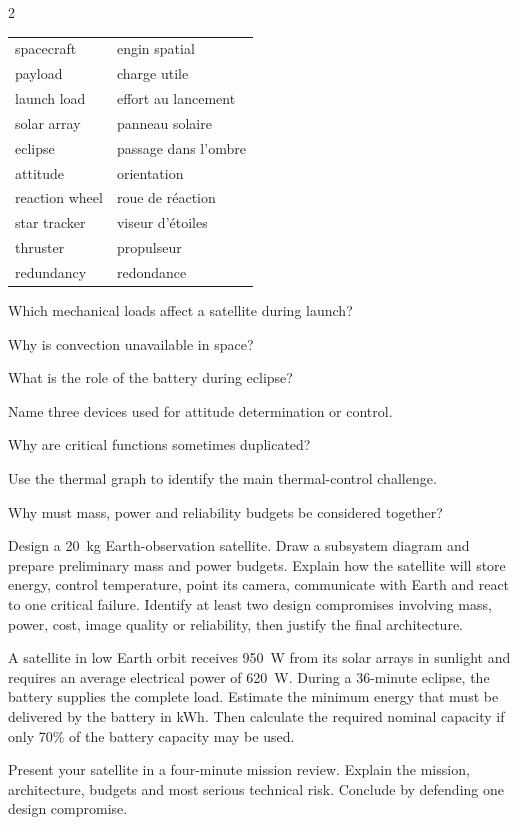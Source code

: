 \begin{multicols}{2}
\begin{vocabulary}
\begin{tabularx}{\linewidth}{@{}lX@{}}
spacecraft & engin spatial\\
payload & charge utile\\
launch load & effort au lancement\\
solar array & panneau solaire\\
eclipse & passage dans l'ombre\\
attitude & orientation\\
reaction wheel & roue de réaction\\
star tracker & viseur d'étoiles\\
thruster & propulseur\\
redundancy & redondance
\end{tabularx}
\end{vocabulary}

\begin{questions}
\item Which mechanical loads affect a satellite during launch?
\item Why is convection unavailable in space?
\item What is the role of the battery during eclipse?
\item Name three devices used for attitude determination or control.
\item Why are critical functions sometimes duplicated?
\item Use the thermal graph to identify the main thermal-control challenge.
\item Why must mass, power and reliability budgets be considered together?
\end{questions}

\begin{engineeringchallenge}
Design a 20~kg Earth-observation satellite. Draw a subsystem diagram and prepare preliminary mass and power budgets. Explain how the satellite will store energy, control temperature, point its camera, communicate with Earth and react to one critical failure. Identify at least two design compromises involving mass, power, cost, image quality or reliability, then justify the final architecture.
\end{engineeringchallenge}

\begin{applicationexercise}
A satellite in low Earth orbit receives 950~W from its solar arrays in sunlight and requires an average electrical power of 620~W. During a 36-minute eclipse, the battery supplies the complete load. Estimate the minimum energy that must be delivered by the battery in kWh. Then calculate the required nominal capacity if only 70\% of the battery capacity may be used.
\end{applicationexercise}

\begin{speaking}
Present your satellite in a four-minute mission review. Explain the mission, architecture, budgets and most serious technical risk. Conclude by defending one design compromise.
\end{speaking}
\end{multicols}

